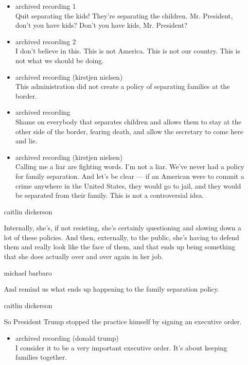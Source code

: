 \begin{itemize}
\item
  archived recording 1\\
  Quit separating the kids! They're separating the children. Mr.
  President, don't you have kids? Don't you have kids, Mr. President?
\item
  archived recording 2\\
  I don't believe in this. This is not America. This is not our country.
  This is not what we should be doing.
\item
  archived recording (kirstjen nielsen)\\
  This administration did not create a policy of separating families at
  the border.
\item
  archived recording\\
  Shame on everybody that separates children and allows them to stay at
  the other side of the border, fearing death, and allow the secretary
  to come here and lie.
\item
  archived recording (kirstjen nielsen)\\
  Calling me a liar are fighting words. I'm not a liar. We've never had
  a policy for family separation. And let's be clear --- if an American
  were to commit a crime anywhere in the United States, they would go to
  jail, and they would be separated from their family. This is not a
  controversial idea.
\end{itemize}

caitlin dickerson

Internally, she's, if not resisting, she's certainly questioning and
slowing down a lot of these policies. And then, externally, to the
public, she's having to defend them and really look like the face of
them, and that ends up being something that she does actually over and
over again in her job.

michael barbaro

And remind us what ends up happening to the family separation policy.

caitlin dickerson

So President Trump stopped the practice himself by signing an executive
order.

\begin{itemize}
\tightlist
\item
  archived recording (donald trump)\\
  I consider it to be a very important executive order. It's about
  keeping families together.
\end{itemize}

